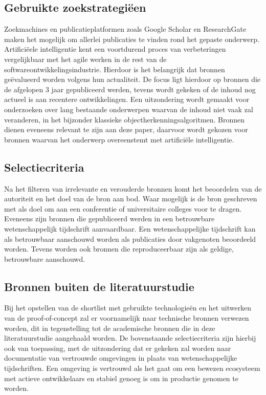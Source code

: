 
\subsection{Gebruikte zoekstrategiëen}
\label{subsec:zoekstrategieen}
Zoekmachines en publicatieplatformen zoals Google Scholar en ResearchGate maken het mogelijk om allerlei publicaties te vinden rond het gepaste onderwerp.
Artifici\"eele intelligentie kent een voortdurend proces van verbeteringen vergelijkbaar met het agile werken in de rest van de softwareontwikkelingsindustrie.
Hierdoor is het belangrijk dat bronnen ge\"evalueerd worden volgens hun actualiteit.
De focus ligt hierdoor op bronnen die de afgelopen 3 jaar gepubliceerd werden, tevens wordt gekeken of de inhoud nog actueel is aan recentere ontwikkelingen.
Een uitzondering wordt gemaakt voor onderzoeken over lang bestaande onderwerpen waarvan de inhoud niet vaak zal veranderen, in het bijzonder klassieke objectherkenningsalgoritmen.
Bronnen dienen eveneens relevant te zijn aan deze paper, daarvoor wordt gekozen voor bronnen waarvan het onderwerp overeenstemt met artifici\"ele intelligentie.


\subsection{Selectiecriteria}
\label{subsec:selectiecriteria}
Na het filteren van irrelevante en verouderde bronnen komt het beoordelen van de autoriteit en het doel van de bron aan bod.
Waar mogelijk is de bron geschreven met als doel om aan een conferentie of universitaire colleges voor te dragen.
Eveneens zijn bronnen die gepubliceerd werden in een betrouwbare wetenschappelijk tijdschrift aanvaardbaar.
Een wetenschappelijke tijdschrift kan als betrouwbaar aanschouwd worden als publicaties door vakgenoten beoordeeld worden.
Tevens worden ook bronnen die reproduceerbaar zijn als geldige, betrouwbare aanschouwd.


\subsection{Bronnen buiten de literatuurstudie}
\label{subsec:bronnen-buiten-de-literatuurstudie}
Bij het opstellen van de shortlist met gebruikte technologie\"en en het uitwerken van de proof-of-concept zal er voornamelijk naar technische bronnen verwezen worden, dit in tegenstelling tot de academische bronnen die in deze literatuurstudie aangehaald worden.
De bovenstaande selectiecriteria zijn hierbij ook van toepassing, met de uitzondering dat er gekeken zal worden naar documentatie van vertrouwde omgevingen in plaats van wetenschappelijke tijdschriften.
Een omgeving is vertrouwd als het gaat om een bewezen ecosysteem met actieve ontwikkelaars en stabiel genoeg is om in productie genomen te worden.


